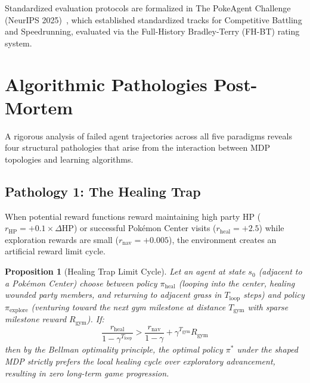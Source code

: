 \documentclass[journal,10pt,twocolumn]{IEEEtran}
\newtheorem{proposition}{Proposition}
\begin{document}
Standardized evaluation protocols are formalized in The PokeAgent Challenge (NeurIPS 2025)~\cite{karten2026pokeagent}, which established standardized tracks for Competitive Battling and Speedrunning, evaluated via the Full-History Bradley-Terry (FH-BT) rating system.

\section{Algorithmic Pathologies Post-Mortem}
\label{sec:pathologies}
A rigorous analysis of failed agent trajectories across all five paradigms reveals four structural pathologies that arise from the interaction between MDP topologies and learning algorithms.

\subsection{Pathology 1: The Healing Trap}
When potential reward functions reward maintaining high party HP ($r_{\text{HP}} = +0.1 \times \Delta\text{HP}$) or successful Pok{\'e}mon Center visits ($r_{\text{heal}} = +2.5$) while exploration rewards are small ($r_{\text{nav}} = +0.005$), the environment creates an artificial reward limit cycle.
\begin{proposition}[Healing Trap Limit Cycle]
\label{prop:healing_trap}
Let an agent at state $s_0$ (adjacent to a Pok{\'e}mon Center) choose between policy $\pi_{\text{heal}}$ (looping into the center, healing wounded party members, and returning to adjacent grass in $T_{\text{loop}}$ steps) and policy $\pi_{\text{explore}}$ (venturing toward the next gym milestone at distance $T_{\text{gym}}$ with sparse milestone reward $R_{\text{gym}}$). If:
\begin{equation}
\frac{r_{\text{heal}}}{1 - \gamma^{T_{\text{loop}}}} > \frac{r_{\text{nav}}}{1 - \gamma} + \gamma^{T_{\text{gym}}} R_{\text{gym}}
\end{equation}
then by the Bellman optimality principle, the optimal policy $\pi^*$ under the shaped MDP strictly prefers the local healing cycle over exploratory advancement, resulting in zero long-term game progression.
\end{proposition}
\end{document}
